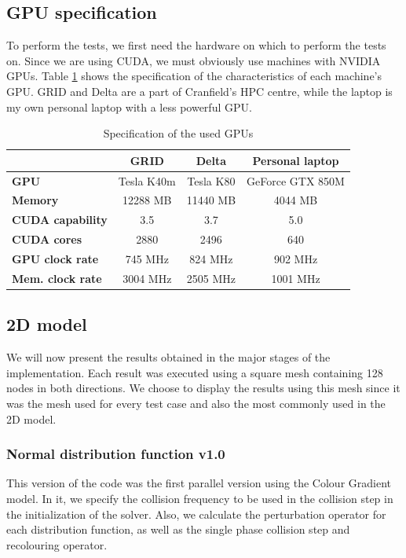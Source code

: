 \documentclass[12pt, openany]{book}
\begin{document}
\subsection{GPU specification}
To perform the tests, we first need the hardware on which to perform the tests on. Since we are using CUDA, we must obviously use machines with NVIDIA GPUs. Table \ref{tab:specs} shows the specification of the characteristics of each machine's GPU. GRID and Delta are a part of Cranfield's HPC centre, while the laptop is my own personal laptop with a less powerful GPU.
\begin{table}[H]
	\centering
	\begin{tabular}{|l|c|c|c|}
		\hline
		\multicolumn{1}{|c|}{\textbf{}} & \textbf{GRID} & \textbf{Delta} & \textbf{Personal laptop} \\ \hline
		\textbf{GPU}                    & Tesla K40m    & Tesla K80      & GeForce GTX 850M         \\ \hline
		\textbf{Memory}                 & 12288 MB      & 11440 MB       & 4044 MB                  \\ \hline
		\textbf{CUDA capability}        & 3.5           & 3.7            & 5.0                       \\ \hline
		\textbf{CUDA cores}             & 2880          & 2496           & 640                      \\ \hline
		\textbf{GPU clock rate}         & 745 MHz       & 824 MHz        & 902 MHz                  \\ \hline
		\textbf{Mem. clock rate}        & 3004 MHz      & 2505 MHz       & 1001 MHz                 \\ \hline
	\end{tabular}
	\caption{Specification of the used GPUs}
	\label{tab:specs}
\end{table}

\subsection{2D model}
We will now present the results obtained in the major stages of the implementation. Each result was executed using a square mesh containing 128 nodes in both directions. We choose to display the results using this mesh since it was the mesh used for every test case and also the most commonly used in the 2D model.

\subsubsection{Normal distribution function v1.0}
This version of the code was the first parallel version using the Colour Gradient model. In it, we specify the collision frequency to be used in the collision step in the initialization of the solver. Also, we calculate the perturbation operator for each distribution function, as well as the single phase collision step and recolouring operator.
  
\end{document}
